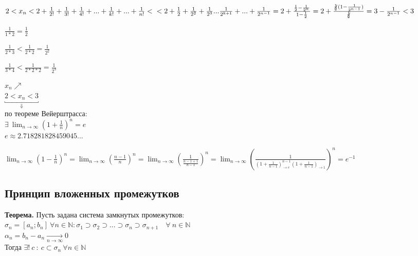 \documentclass{article}
\begin{document}
    \( 2 < x_n < 2 + \frac{1}{2!} + \frac{1}{3!} + \frac{1}{4!} + ... + \frac{1}{k!} + ... + \frac{1}{n!} <\\
    < 2 + \frac{1}{2} + \frac{1}{2^2} + \frac{1}{2^3} ... \frac{1}{2^{k+1}}+...+\frac{1}{2^{n-1}} = 2 + \frac{\frac{1}{2} - \frac{1}{2^n}}{1 - \frac{1}{2}} = 2 + \frac{\not\frac{1}{2}(1-\frac{1}{2^{n-1}})}{\not\frac{1}{2}} = 3 - \frac{1}{2^{n-1}} < 3\)

    \( \frac{1}{1*2} = \frac{1}{2} \)

    \( \frac{1}{2*3} < \frac{1}{2*2} = \frac{1}{2^2} \)

    \( \frac{1}{3*4} < \frac{1}{2*2*2} = \frac{1}{2^3} \)

    \( x_n \nearrow \)\\
    \(\underbracket{2 < x_n < 3}_{\Downarrow} \)\\
    по теореме Вейерштрасса:\\
    \( \exists\ \lim_{n \rightarrow \infty} (1 + \frac{1}{n})^n = e \)
    \\\(e \approx 2.718281828459045...\)

    \(\lim_{n \rightarrow \infty}{(1 - \frac{1}{n})^n} = \lim_{n \rightarrow \infty}{(\frac{n-1}{n})^n} = \lim_{n \rightarrow \infty}{(\frac{1}{\frac{n-1+1}{n-1}})^n} = \lim_{n \rightarrow \infty}{(\frac{1}{(1 + \frac{1}{n-1})^{n-1}_{\rightarrow e}(1 + \frac{1}{n-1})_{\rightarrow 1}})^n} = e^{-1}\)

    \subsection{Принцип вложенных промежутков}
    
    \textbf{Теорема.} Пусть задана система замкнутых промежутков:\\
    \(\sigma_n = [a_n; b_n]\ \forall n \in \mathbb{N}:\sigma_1 \supset \sigma_2 \supset ... \supset \sigma_n \supset \sigma_{n+1}\quad \forall\ n \in \mathbb{N}\)\\
    \(\alpha_n = b_n - a_n \xrightarrow[n \rightarrow \infty]{} 0\)\\
    Тогда \(\exists !\ c\ :\ c \subset \sigma_n\ \forall n \in \mathbb{N}\)
\end{document}
